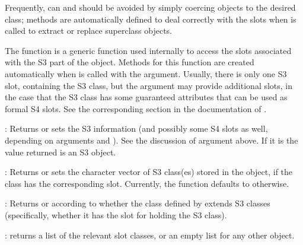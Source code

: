 \begin{Details}
Frequently,  can and should be avoided by simply
coercing objects to the desired class; methods are automatically
defined to deal correctly with the slots when  is
called to extract or replace superclass objects.

The function  is a generic function used
internally to access the slots associated with the S3 part of the
object.  Methods for this function are created automatically when
 is called with the 
argument.  Usually, there is only one S3 slot, containing the S3
class, but the  argument may provide additional slots,
in the case that the S3 class has some guaranteed attributes that
can be used as formal S4 slots.  See the corresponding section in
the documentation of .
\end{Details}
%
\begin{Value}

:  Returns or sets  the S3 information
(and possibly some S4 slots as well, depending on arguments
 and ).  See the discussion of
argument  above.  If it is  the value
returned is an S3 object.


:  Returns or sets the character vector of S3 class(es) stored in
the object, if the class has the corresponding  slot.
Currently, the function defaults to  otherwise.

: Returns  or  according
to whether the class defined by 
extends S3 classes (specifically, whether it has the slot for
holding the S3 class).

: returns a list of the relevant slot classes, or an
empty list for any other object.
\end{Value}
%

